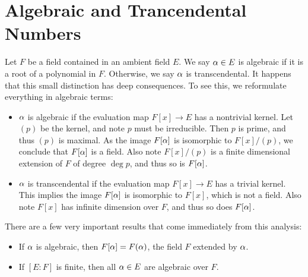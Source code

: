 \section{Algebraic and Trancendental Numbers}
Let $F$ be a field contained in an ambient field $E$. We say $\alpha \in E$ is algebraic if it is a root of a polynomial in $F$. Otherwise, we say $\alpha$ is transcendental. It happens that this small distinction has deep consequences. To see this, we reformulate everything in algebraic terms:
\begin{itemize}
    \item $\alpha$ is algebraic if the evaluation map $F[x] \rightarrow E$ has a nontrivial kernel. Let $(p)$ be the kernel, and note $p$ must be irreducible. Then $p$ is prime, and thus $(p)$ is maximal. As the image $F[\alpha]$ is isomorphic to $F[x]/(p)$, we conclude that $F[\alpha]$ is a field. Also note $F[x]/(p)$ is a finite dimensional extension of $F$ of degree $\deg p$, and thus so is $F[\alpha]$.
    \item $\alpha$ is transcendental if the evaluation map $F[x] \rightarrow E$ has a trivial kernel. This implies the image $F[\alpha]$ is isomorphic to $F[x]$, which is not a field. Also note $F[x]$ has infinite dimension over $F$, and thus so does $F[\alpha]$.
\end{itemize}
There are a few very important results that come immediately from this analysis:
\begin{itemize}
    \item If $\alpha$ is algebraic, then $F[\alpha] = F(\alpha)$, the field $F$ extended by $\alpha$.
    \item If $[E : F]$ is finite, then all $\alpha \in E$ are algebraic over $F$.
\end{itemize}
